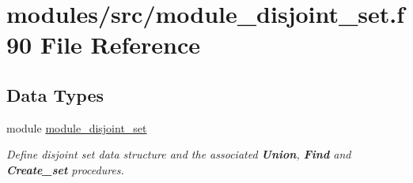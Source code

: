 \hypertarget{module__disjoint__set_8f90}{
\section{modules/src/module\-\_\-disjoint\-\_\-set.f90 \-File \-Reference}
\label{module__disjoint__set_8f90}
}
\subsection*{\-Data \-Types}
\begin{DoxyCompactItemize}
\item 
module \hyperlink{classmodule__disjoint__set}{module\-\_\-disjoint\-\_\-set}
\begin{DoxyCompactList}\small\item\em \-Define disjoint set data structure and the associated {\bfseries \-Union}, {\bfseries \-Find} and {\bfseries \-Create\-\_\-set} procedures. \end{DoxyCompactList}\end{DoxyCompactItemize}
